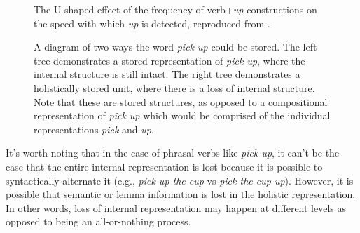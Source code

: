 \documentclass[
  authoryear,
  preprint,
  1p,
  onecolumn]{elsarticle}
\begin{document}
\begin{figure}


\caption{\label{fig-kapatsinskiplot}The U-shaped effect of the frequency
of verb+\emph{up} constructions on the speed with which \emph{up} is
detected, reproduced from \citet{kapatsinski2009}.}

\end{figure}%

\begin{figure}


\caption{\label{fig-lossinternalstructure}A diagram of two ways the word
\emph{pick up} could be stored. The left tree demonstrates a stored
representation of \emph{pick up}, where the internal structure is still
intact. The right tree demonstrates a holistically stored unit, where
there is a loss of internal structure. Note that these are stored
structures, as opposed to a compositional representation of \emph{pick
up} which would be comprised of the individual representations
\emph{pick} and \emph{up}.}

\end{figure}%

It's worth noting that in the case of phrasal verbs like \emph{pick up},
it can't be the case that the entire internal representation is lost
because it is possible to syntactically alternate it (e.g., \emph{pick
up the cup} vs \emph{pick the cup up}). However, it is possible that
semantic or lemma information is lost in the holistic representation. In
other words, loss of internal representation may happen at different
levels as opposed to being an all-or-nothing process.
\end{document}
